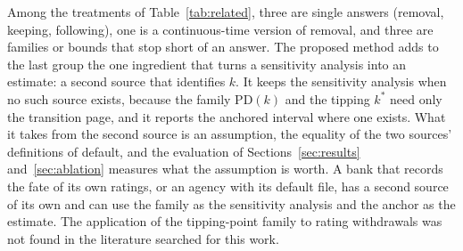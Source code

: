 Among the treatments of Table~\ref{tab:related}, three are single answers (removal, keeping, following), one is a continuous-time version of removal, and three are families or bounds that stop short of an answer. The proposed method adds to the last group the one ingredient that turns a sensitivity analysis into an estimate: a second source that identifies $k$. It keeps the sensitivity analysis when no such source exists, because the family PD$(k)$ and the tipping $k^{*}$ need only the transition page, and it reports the anchored interval where one exists. What it takes from the second source is an assumption, the equality of the two sources' definitions of default, and the evaluation of Sections~\ref{sec:results} and~\ref{sec:ablation} measures what the assumption is worth. A bank that records the fate of its own \wdn{} ratings, or an agency with its default file, has a second source of its own and can use the family as the sensitivity analysis and the anchor as the estimate. The application of the tipping-point family to rating withdrawals was not found in the literature searched for this work.
